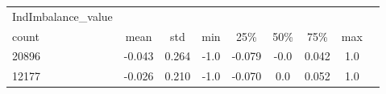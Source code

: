 \begin{tabular}{lcccccccc}
\toprule
IndImbalance\_value &        &       &      &        &      &       &     \\
             count &   mean &   std &  min &    25\% &  50\% &   75\% & max \\
             20896 & -0.043 & 0.264 & -1.0 & -0.079 & -0.0 & 0.042 & 1.0 \\
\midrule
             12177 & -0.026 & 0.210 & -1.0 & -0.070 &  0.0 & 0.052 & 1.0 \\
\bottomrule
\end{tabular}
